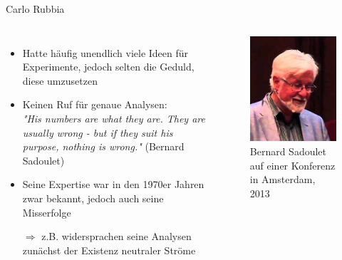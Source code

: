 \documentclass[aspectratio=1610, professionalfonts, 10pt]{beamer}
\begin{document}
\begin{frame}{Carlo Rubbia}
	\begin{columns}
				\begin{itemize}
					\setlength\itemsep{0.5em}
					\item Hatte häufig unendlich viele Ideen für Experimente, jedoch selten die Geduld, diese umzusetzen
					\item Keinen Ruf für genaue Analysen:\\
					\emph{"His numbers are what they are. They are usually wrong - but if they suit his purpose, nothing is wrong."} (Bernard Sadoulet)
					\item Seine Expertise war in den 1970er Jahren zwar bekannt, jedoch auch seine Misserfolge
					\item[$\Rightarrow$] z.B. widersprachen seine Analysen zunächst der Existenz neutraler Ströme
				\end{itemize}

			\begin{figure}
	  			\centering
				\includegraphics[width=0.8\linewidth]{Images/sadoulet.png}
	  			\caption{Bernard Sadoulet auf einer Konferenz in Amsterdam, 2013 \cite{Sadoulet}}
	  			\label{fig:sad}
			\end{figure}
	\end{columns}
\end{frame}
\end{document}
